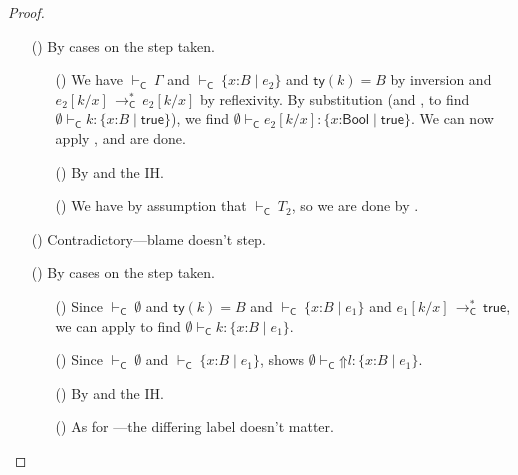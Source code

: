 \documentclass[9pt]{extarticle}
\newcommand{\ottnt}[1]{\mathit{#1}}
\newcommand{\ottsym}[1]{#1}
\begin{document}
\begin{lemma}
\begin{proof}
{\begin{itemize}
    \item[(\T{Cast})] By cases on the step taken.
\begin{itemize}
      \item[(\ECheckNone)] We have $ \mathord{  \vdash _{  \mathsf{C}  } }~ \Gamma $ and $ \mathord{  \vdash _{  \mathsf{C}  } }~  \{ \mathit{x} \mathord{:} \ottnt{B} \mathrel{\mid} \ottnt{e_{{\mathrm{2}}}} \}  $ and
        $ \mathsf{ty} ( \ottnt{k} )   \ottsym{=}  \ottnt{B}$ by inversion and $ \ottnt{e_{{\mathrm{2}}}}  [  \ottnt{k} / \mathit{x}  ]  \,  \longrightarrow ^{*}_{  \mathsf{C}  }  \,  \ottnt{e_{{\mathrm{2}}}}  [  \ottnt{k} / \mathit{x}  ] $ by
        reflexivity. By substitution (and , to find $ \emptyset   \vdash _{  \mathsf{C}  }  \ottnt{k}  :   \{ \mathit{x} \mathord{:} \ottnt{B} \mathrel{\mid}  \mathsf{true}  \}  $), we find $ \emptyset   \vdash _{  \mathsf{C}  }   \ottnt{e_{{\mathrm{2}}}}  [  \ottnt{k} / \mathit{x}  ]   :   \{ \mathit{x} \mathord{:}  \mathsf{Bool}  \mathrel{\mid}  \mathsf{true}  \}  $. We can now apply , and are done.
      \item[(\E{CastInnerC})] By  and the IH.
      \item[(\E{CastRaise})] We have by assumption that $ \mathord{  \vdash _{  \mathsf{C}  } }~ \ottnt{T_{{\mathrm{2}}}} $,
        so we are done by .
      \end{itemize}

    \item[(\T{Blame})] Contradictory---blame doesn't step.

    \item[(\T{Check})] By cases on the step taken.
\begin{itemize}
      \item[(\E{CheckOK})] Since $ \mathord{  \vdash _{  \mathsf{C}  } }~ \emptyset $ and $ \mathsf{ty} ( \ottnt{k} )   \ottsym{=}  \ottnt{B}$
        and $ \mathord{  \vdash _{  \mathsf{C}  } }~  \{ \mathit{x} \mathord{:} \ottnt{B} \mathrel{\mid} \ottnt{e_{{\mathrm{1}}}} \}  $ and $ \ottnt{e_{{\mathrm{1}}}}  [  \ottnt{k} / \mathit{x}  ]  \,  \longrightarrow ^{*}_{  \mathsf{C}  }  \,  \mathsf{true} $, we can
        apply  to find $ \emptyset   \vdash _{  \mathsf{C}  }  \ottnt{k}  :   \{ \mathit{x} \mathord{:} \ottnt{B} \mathrel{\mid} \ottnt{e_{{\mathrm{1}}}} \}  $.
      \item[(\E{CheckFail})] Since $ \mathord{  \vdash _{  \mathsf{C}  } }~ \emptyset $ and $ \mathord{  \vdash _{  \mathsf{C}  } }~  \{ \mathit{x} \mathord{:} \ottnt{B} \mathrel{\mid} \ottnt{e_{{\mathrm{1}}}} \}  $,  shows $ \emptyset   \vdash _{  \mathsf{C}  }   \mathord{\Uparrow}  \ottnt{l}   :   \{ \mathit{x} \mathord{:} \ottnt{B} \mathrel{\mid} \ottnt{e_{{\mathrm{1}}}} \}  $.
      \item[(\E{CheckInner})] By  and the IH.
      \item[(\E{CheckRaise})] As for ---the differing
        label doesn't matter.
      \end{itemize}


\end{itemize}}
\end{proof}
\end{lemma}
\end{document}
